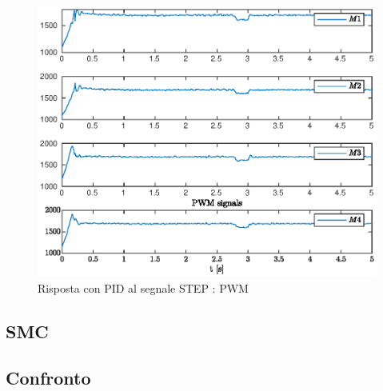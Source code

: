 \begin{figure}
	\centering
	\includegraphics[width=4\textwidth]{Simulazioni/Figure/STEPpwmPID}
	\caption{Risposta con PID al segnale STEP : PWM}
\end{figure}

\clearpage

\subsection{SMC}


\clearpage
\subsection{Confronto}